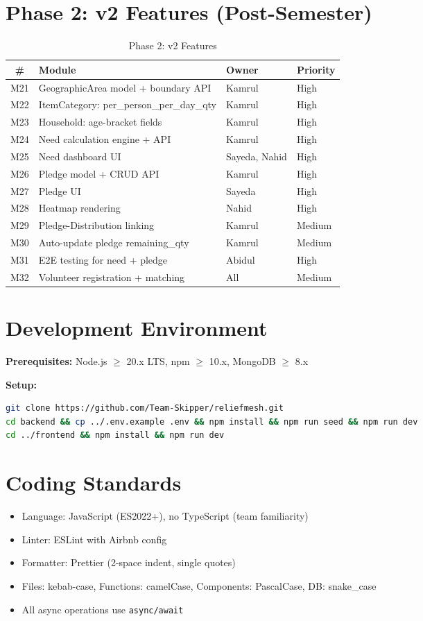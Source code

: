\section{Phase 2: v2 Features (Post-Semester)}
\begin{table}[H]
\centering
\caption{Phase 2: v2 Features}
\label{tab:phase2}
\begin{tabularx}{\textwidth}{@{}cllX@{}}
\toprule
\# & Module & Owner & Priority \\
\midrule
M21 & GeographicArea model + boundary API & Kamrul & High \\
M22 & ItemCategory: per\_person\_per\_day\_qty & Kamrul & High \\
M23 & Household: age-bracket fields & Kamrul & High \\
M24 & Need calculation engine + API & Kamrul & High \\
M25 & Need dashboard UI & Sayeda, Nahid & High \\
M26 & Pledge model + CRUD API & Kamrul & High \\
M27 & Pledge UI & Sayeda & High \\
M28 & Heatmap rendering & Nahid & High \\
M29 & Pledge-Distribution linking & Kamrul & Medium \\
M30 & Auto-update pledge remaining\_qty & Kamrul & Medium \\
M31 & E2E testing for need + pledge & Abidul & High \\
M32 & Volunteer registration + matching & All & Medium \\
\bottomrule
\end{tabularx}
\end{table}

\section{Development Environment}
\textbf{Prerequisites:} Node.js $\ge$ 20.x LTS, npm $\ge$ 10.x, MongoDB $\ge$ 8.x

\textbf{Setup:}
\begin{lstlisting}[language=bash]
git clone https://github.com/Team-Skipper/reliefmesh.git
cd backend && cp ../.env.example .env && npm install && npm run seed && npm run dev
cd ../frontend && npm install && npm run dev
\end{lstlisting}

\section{Coding Standards}
\begin{itemize}[nosep]
    \item Language: JavaScript (ES2022+), no TypeScript (team familiarity)
    \item Linter: ESLint with Airbnb config
    \item Formatter: Prettier (2-space indent, single quotes)
    \item Files: kebab-case, Functions: camelCase, Components: PascalCase, DB: snake\_case
    \item All async operations use \texttt{async/await}
\end{itemize}

